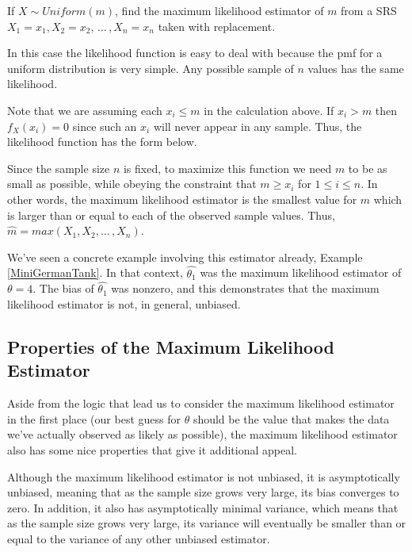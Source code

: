 \begin{examp}\label{TankProblemMLE}
If $X \sim Uniform(m)$, find the maximum likelihood estimator of $m$ from a SRS $X_1 = x_1, X_2 = x_2, \, \dots \,, X_n = x_n$ taken with replacement.
\par
\noindent In this case the likelihood function is easy to deal with because the pmf for a uniform distribution is very simple. Any possible sample of $n$ values has the same likelihood.
\par
\noindent Note that we are assuming each $x_i \leq m$ in the calculation above. If $x_i > m$ then $f_X(x_i) = 0$ since such an $x_i$ will never appear in any sample. Thus, the likelihood function has the form below.
\renewcommand*{\arraystretch}{1.35}
\renewcommand*{\arraystretch}{1}
\par
\noindent Since the sample size $n$ is fixed, to maximize this function we need $m$ to be as small as possible, while obeying the constraint that $m \geq x_i$ for $1 \leq i \leq n$. In other words, the maximum likelihood estimator is the smallest value for $m$ which is larger than or equal to each of the observed sample values. Thus, $\widehat{m} = max(X_1,X_2, \dots\,, X_n)$.
\end{examp}
\par
We've seen a concrete example involving this estimator already, Example \ref{MiniGermanTank}. In that context, $\widehat{\theta_1}$ was the maximum likelihood estimator of $\theta = 4$. The bias of $\widehat{\theta_1}$ was nonzero, and this demonstrates that the maximum likelihood estimator is not, in general, unbiased.

\subsection*{Properties of the Maximum Likelihood Estimator}

Aside from the logic that lead us to consider the maximum likelihood estimator in the first place (our best guess for $\theta$ should be the value that makes the data we've actually observed as likely as possible), the maximum likelihood estimator also has some nice properties that give it additional appeal.
\par
Although the maximum likelihood estimator is not unbiased, it is asymptotically unbiased, meaning that as the sample size grows very large, its bias converges to zero. In addition, it also has asymptotically minimal variance, which means that as the sample size grows very large, its variance will eventually be smaller than or equal to the variance of any other unbiased estimator.

